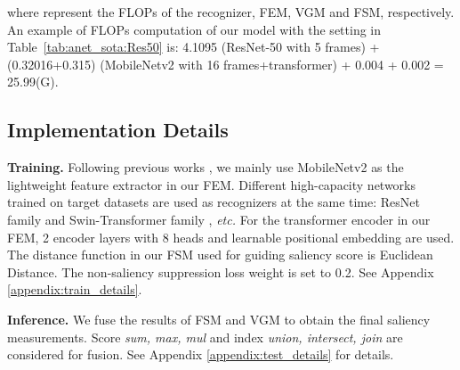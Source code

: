 \documentclass[runningheads]{llncs}
\newcommand{\tabref}[1]{Table~\ref{#1}}
\begin{document}
where  represent the FLOPs of the 
recognizer, FEM, VGM and FSM, respectively. An example of FLOPs computation of our model with the setting in \tabref{tab:anet_sota:Res50} is: 4.1095 (ResNet-50 with 5 frames) + (0.32016+0.315) (MobileNetv2 with 16 frames+transformer) + 0.004 + 0.002 = 25.99(G).
\subsection{Implementation Details}\label{sec:details}
\textbf{Training.} 
Following previous works \cite{smart2020,adaframe}, we mainly use MobileNetv2 \cite{mobilenetv2} as the lightweight feature extractor in our FEM. Different high-capacity networks trained on target datasets are used as recognizers at the same time: ResNet family \cite{resnet} and Swin-Transformer family \cite{swintransformer}, \emph{etc.}
For the transformer encoder in our FEM, 2 encoder layers with 8 heads and learnable positional embedding are used.
The distance function  in our FSM used for guiding saliency score is Euclidean Distance. The non-saliency suppression loss weight  
is set to 0.2. 
See Appendix \ref{appendix:train_details}.

\noindent\textbf{Inference.}
\label{sec:infer}
We fuse the results of FSM and VGM to obtain the final saliency measurements. Score \emph{sum, max, mul} and index \emph{union, intersect, join} are considered for fusion. See Appendix \ref{appendix:test_details} for details.
\end{document}
